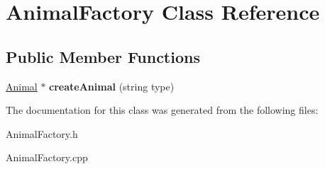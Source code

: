 \hypertarget{class_animal_factory}{}\section{Animal\+Factory Class Reference}
\label{class_animal_factory}
\subsection*{Public Member Functions}
\begin{DoxyCompactItemize}
\item 
\mbox{\label{class_animal_factory_a1f6082d5df78aa84dd5a01404ea27f85}} 
\hyperlink{class_animal}{Animal} $\ast$ {\bfseries create\+Animal} (string type)
\end{DoxyCompactItemize}


The documentation for this class was generated from the following files\+:\begin{DoxyCompactItemize}
\item 
Animal\+Factory.\+h\item 
Animal\+Factory.\+cpp\end{DoxyCompactItemize}
